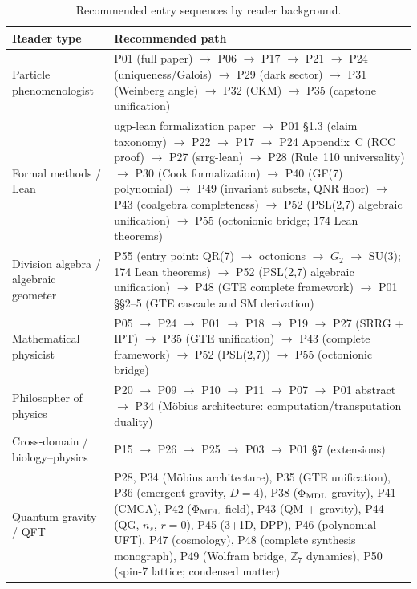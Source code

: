 \documentclass[11pt]{article}
\begin{document}
\begin{table}[H]
\centering
\small
\renewcommand{\arraystretch}{1.25}
\caption{Recommended entry sequences by reader background.}
\label{tab:reading_paths}
{\sloppy\begin{tabularx}{\textwidth}{@{}p{3.4cm}X@{}}
\toprule
\textbf{Reader type} & \textbf{Recommended path} \\
\midrule
Particle phenomenologist
  & P01 (full paper) $\to$ P06 $\to$ P17 $\to$ P21
    $\to$ P24 (uniqueness/Galois) $\to$ P29 (dark sector)
    $\to$ P31 (Weinberg angle) $\to$ P32 (CKM) $\to$ P35 (capstone unification) \\
\midrule
Formal methods / Lean
  & ugp-lean formalization paper $\to$ P01 \S1.3 (claim taxonomy)
    $\to$ P22 $\to$ P17 $\to$ P24 Appendix~C (RCC proof) $\to$ P27 (srrg-lean)
    $\to$ P28 (Rule~110 universality) $\to$ P30 (Cook formalization)
    $\to$ P40 (GF(7) polynomial) $\to$ P49 (invariant subsets, QNR floor)
    $\to$ P43 (coalgebra completeness)
    $\to$ P52 (PSL(2,7) algebraic unification) $\to$ P55 (octonionic bridge; 174 Lean theorems) \\
\midrule
Division algebra / algebraic geometer
  & P55 (entry point: QR(7) $\to$ octonions $\to$ $G_2$ $\to$ SU(3); 174 Lean theorems)
    $\to$ P52 (PSL(2,7) algebraic unification)
    $\to$ P48 (GTE complete framework)
    $\to$ P01 \S\S2--5 (GTE cascade and SM derivation) \\
\midrule
Mathematical physicist
  & P05 $\to$ P24 $\to$ P01 $\to$ P18 $\to$ P19
    $\to$ P27 (SRRG + IPT) $\to$ P35 (GTE unification) $\to$ P43 (complete framework)
    $\to$ P52 (PSL(2,7)) $\to$ P55 (octonionic bridge) \\
\midrule
Philosopher of physics
  & P20 $\to$ P09 $\to$ P10 $\to$ P11 $\to$ P07 $\to$ P01 abstract
    $\to$ P34 (Möbius architecture: computation/transputation duality) \\
\midrule
Cross-domain / biology--physics
  & P15 $\to$ P26 $\to$ P25 $\to$ P03 $\to$ P01 \S7 (extensions) \\
\midrule
Quantum gravity / QFT
  & {\sloppy P28, P34 (Möbius architecture), P35 (GTE unification),
    P36 (emergent gravity, $D=4$), P38 ($\Phi_{\rm MDL}$ gravity),
    P41 (CMCA), P42 ($\Phi_{\rm MDL}$ field),
    P43 (QM + gravity), P44 (QG, $n_s$, $r=0$),
    P45 (3+1D, DPP), P46 (polynomial UFT), P47 (cosmology),
    P48 (complete synthesis monograph),
    P49 (Wolfram bridge, $\mathbb{Z}_7$ dynamics),
    P50 (spin-7 lattice; condensed matter)} \\
\midrule

\end{tabularx}}
\end{table}
\end{document}
